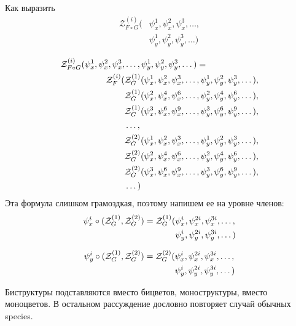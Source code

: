 \begin{problem}
Как выразить
\begin{equation*}
\begin{split}
\mathcal Z^{(i)}_{F \circ G} (&\psi_x^1, \psi_x^2, \psi_x^3, \dots, \\
						&\psi_y^1, \psi_y^2, \psi_y^3, \dots)
\end{split}
\end{equation*}
\end{problem}

\begin{theorem}
\begin{equation}
\begin{split}
\label{eq:h-zfg}
	\mathcal Z^{(i)}_{F \circ G} (\psi_x^1, \psi_x^2, \psi_x^3, &\dots, 
	\psi_y^1, \psi_y^2, \psi_y^3, \dots) = \\
	\mathcal Z_F^{(i)}(
		&\mathcal Z^{(1)}_G(\psi_x^1, \psi_x^2, \psi_x^3, \dots, 
					 \psi_y^1, \psi_y^2, \psi_y^3, \dots), \\
		&\mathcal Z^{(1)}_G(\psi_x^2, \psi_x^4, \psi_x^6, \dots, 
					 \psi_y^2, \psi_y^4, \psi_y^6, \dots), \\
		&\mathcal Z^{(1)}_G(\psi_x^3, \psi_x^6, \psi_x^9, \dots, 
					 \psi_y^3, \psi_y^6, \psi_y^9, \dots), \\
		&\dots, \\
		&\mathcal Z^{(2)}_G(\psi_x^1, \psi_x^2, \psi_x^3, \dots, 
					 \psi_y^1, \psi_y^2, \psi_y^3, \dots), \\
		&\mathcal Z^{(2)}_G(\psi_x^2, \psi_x^4, \psi_x^6, \dots, 
					 \psi_y^2, \psi_y^4, \psi_y^6, \dots), \\
		&\mathcal Z^{(2)}_G(\psi_x^3, \psi_x^6, \psi_x^9, \dots, 
					 \psi_y^3, \psi_y^6, \psi_y^9, \dots), \\
		&\dots
	)
\end{split}	
\end{equation}
Эта формула слишком грамоздкая, поэтому напишем ее на уровне членов:
\begin{equation*}
\begin{split}
\psi_x^i \circ (\mathcal Z^{(1)}_G, \mathcal Z^{(2)}_G ) = \mathcal Z^{(1)}_G
(&\psi_x^i, \psi_x^{2i}, \psi_x^{3i}, \dots, \\
&\psi_y^i, \psi_y^{2i}, \psi_y^{3i}, \dots)
\end{split}
\end{equation*}

\begin{equation*}
\begin{split}
\psi_y^i \circ (\mathcal Z^{(1)}_G, \mathcal Z^{(2)}_G ) = \mathcal Z^{(2)}_G
(&\psi_x^i, \psi_x^{2i}, \psi_x^{3i}, \dots, \\
&\psi_y^i, \psi_y^{2i}, \psi_y^{3i}, \dots)
\end{split}
\end{equation*}
\end{theorem}
Биструктуры подставляются вместо бицветов, моноструктуры, вместо моноцветов. В
остальном рассуждение дословно повторяет случай обычных species.

